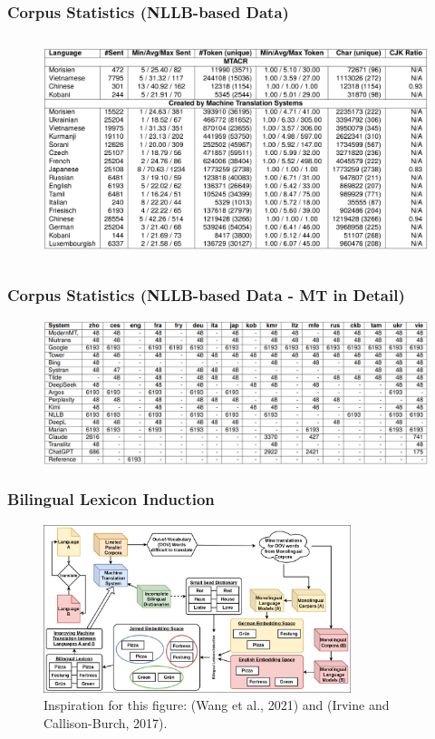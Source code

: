 \documentclass[aspectratio=169]{beamer}
\begin{document}
\begin{frame}[fragile]
	\frametitle{Corpus Statistics (NLLB-based Data)}
    \begin{figure}
    \centering
        \includegraphics[height=6.5cm]{images/MTACR-Corpus_statistics_for_NLLB_dataset.png} 
    \end{figure}
\end{frame}

\begin{frame}[fragile]
	\frametitle{Corpus Statistics (NLLB-based Data - MT in Detail)}
    \begin{figure}
    \centering
        \includegraphics[width=1.0\textwidth]{images/MTACR-Total_sentences_for_each_translation_system_and_language.png} 
    \end{figure}
\end{frame}

\begin{frame}[fragile]
	\frametitle{Bilingual Lexicon Induction}
    \begin{figure}
        \centering
        \includegraphics[width=0.8\textwidth]{images/ChameleonMT-BLI-BLI.png}
        \caption{Inspiration for this figure: (Wang et al., 2021) and (Irvine and Callison-Burch, 2017).}
    \end{figure}
\end{frame}
\end{document}
